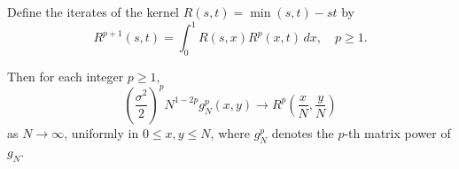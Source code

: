Define the iterates of the kernel $R(s,t) = \min(s,t) - st$ by
$$R^{p+1}(s,t) = \int_0^1 R(s,x) R^p(x,t) \, dx, \quad p \geq 1.$$

Then for each integer $p \geq 1$,
$$\left( \frac{\sigma^2}{2} \right)^p N^{1-2p} g_N^p(x,y) \to R^p\left(\frac{x}{N}, \frac{y}{N}\right)$$
as $N \to \infty$, uniformly in $0 \leq x, y \leq N$, where $g_N^p$ denotes the $p$-th matrix power of $g_N$.
